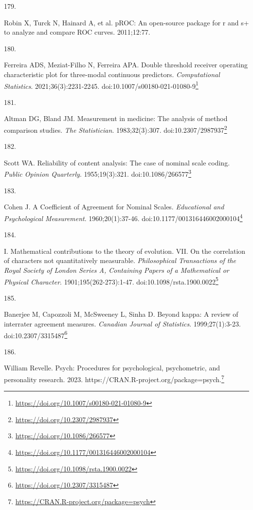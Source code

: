 \documentclass[
  a4paper,
]{book}
\newlength{\cslhangindent}
\newlength{\csllabelwidth}
\newlength{\cslentryspacingunit} %
\newenvironment{CSLReferences}[2] %
 {%
  \setlength{\parindent}{0pt}
  \ifodd #1
  \let\oldpar\par
  \def\par{\hangindent=\cslhangindent\oldpar}
  \fi
  \setlength{\parskip}{#2\cslentryspacingunit}
 }%
 {}
\newcommand{\CSLLeftMargin}[1]{\parbox[t]{\csllabelwidth}{#1}}
\newcommand{\CSLRightInline}[1]{\parbox[t]{\linewidth - \csllabelwidth}{#1}\break}
\renewcommand{\href}[2]{#2\footnote{\url{#1}}}
\begin{document}
\begin{CSLReferences}{0}{0}
\leavevmode{}%
\CSLLeftMargin{179. }%
\CSLRightInline{Robin X, Turck N, Hainard A, et al. pROC: An open-source package for r and s+ to analyze and compare ROC curves. 2011;12:77.}

\leavevmode{}%
\CSLLeftMargin{180. }%
\CSLRightInline{Ferreira ADS, Meziat-Filho N, Ferreira APA. Double threshold receiver operating characteristic plot for three-modal continuous predictors. \emph{Computational Statistics}. 2021;36(3):2231-2245. doi:\href{https://doi.org/10.1007/s00180-021-01080-9}{10.1007/s00180-021-01080-9}}

\leavevmode{}%
\CSLLeftMargin{181. }%
\CSLRightInline{Altman DG, Bland JM. Measurement in medicine: The analysis of method comparison studies. \emph{The Statistician}. 1983;32(3):307. doi:\href{https://doi.org/10.2307/2987937}{10.2307/2987937}}

\leavevmode{}%
\CSLLeftMargin{182. }%
\CSLRightInline{Scott WA. Reliability of content analysis: The case of nominal scale coding. \emph{Public Opinion Quarterly}. 1955;19(3):321. doi:\href{https://doi.org/10.1086/266577}{10.1086/266577}}

\leavevmode{}%
\CSLLeftMargin{183. }%
\CSLRightInline{Cohen J. A Coefficient of Agreement for Nominal Scales. \emph{Educational and Psychological Measurement}. 1960;20(1):37-46. doi:\href{https://doi.org/10.1177/001316446002000104}{10.1177/001316446002000104}}

\leavevmode{}%
\CSLLeftMargin{184. }%
\CSLRightInline{I. Mathematical contributions to the theory of evolution. {\textemdash}VII. On the correlation of characters not quantitatively measurable. \emph{Philosophical Transactions of the Royal Society of London Series A, Containing Papers of a Mathematical or Physical Character}. 1901;195(262-273):1-47. doi:\href{https://doi.org/10.1098/rsta.1900.0022}{10.1098/rsta.1900.0022}}

\leavevmode{}%
\CSLLeftMargin{185. }%
\CSLRightInline{Banerjee M, Capozzoli M, McSweeney L, Sinha D. Beyond kappa: A review of interrater agreement measures. \emph{Canadian Journal of Statistics}. 1999;27(1):3-23. doi:\href{https://doi.org/10.2307/3315487}{10.2307/3315487}}

\leavevmode{}%
\CSLLeftMargin{186. }%
\CSLRightInline{William Revelle. Psych: Procedures for psychological, psychometric, and personality research. 2023. \href{https://CRAN.R-project.org/package=psych}{https://CRAN.R-project.org/package=psych.}}


\end{CSLReferences}
\end{document}
